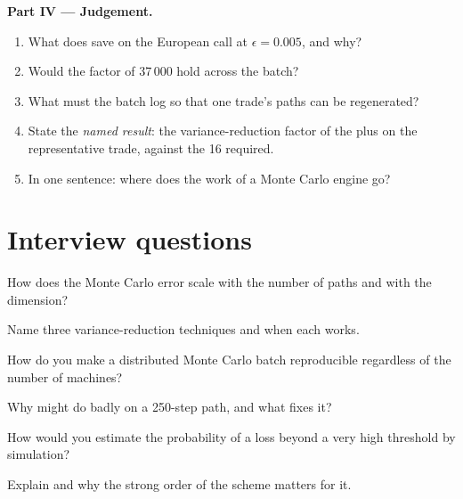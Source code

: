 \begin{problem}
\medskip\noindent\textbf{Part IV --- Judgement.}
\begin{enumerate}[resume]
\item What does  save on the European call at $\epsilon = 0.005$, and why?
\item Would the factor of 37\,000 hold across the batch?
\item What must the batch log so that one trade's paths can be regenerated?
\item State the \emph{named result}: the variance-reduction factor of the  plus  on the representative trade, against the 16 required.
\item In one sentence: where does the work of a Monte Carlo engine go?
\end{enumerate}
\end{problem}

\section{Interview questions}

\begin{interviewq}\label{iq:qm:monte-carlo:1}
How does the Monte Carlo error scale with the number of paths and with the dimension?
\end{interviewq}

\begin{interviewq}\label{iq:qm:monte-carlo:2}
Name three variance-reduction techniques and when each works.
\end{interviewq}

\begin{interviewq}\label{iq:qm:monte-carlo:3}
How do you make a distributed Monte Carlo batch reproducible regardless of the number of machines?
\end{interviewq}

\begin{interviewq}\label{iq:qm:monte-carlo:4}
Why might  do badly on a 250-step path, and what fixes it?
\end{interviewq}

\begin{interviewq}\label{iq:qm:monte-carlo:5}
How would you estimate the probability of a loss beyond a very high threshold by simulation?
\end{interviewq}

\begin{interviewq}\label{iq:qm:monte-carlo:6}
Explain  and why the strong order of the scheme matters for it.
\end{interviewq}
